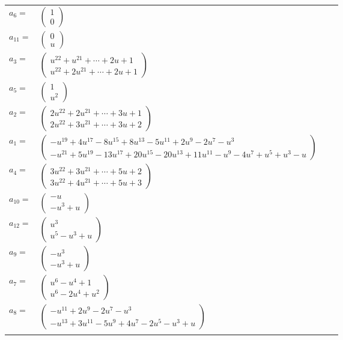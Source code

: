 \documentclass[1p]{elsarticle_modified}
\theoremstyle{definition}
\begin{document}
\begin{tabular}{m{7pt} m{180pt} m{7pt} m{180pt} }
\flushright $a_{6}=$&$\begin{pmatrix}1\\0\end{pmatrix}$ \\
\flushright $a_{11}=$&$\begin{pmatrix}0\\u\end{pmatrix}$ \\
\flushright $a_{3}=$&$\begin{pmatrix}u^{22}+u^{21}+\cdots+2 u+1\\u^{22}+2 u^{21}+\cdots+2 u+1\end{pmatrix}$ \\
\flushright $a_{5}=$&$\begin{pmatrix}1\\u^2\end{pmatrix}$ \\
\flushright $a_{2}=$&$\begin{pmatrix}2 u^{22}+2 u^{21}+\cdots+3 u+1\\2 u^{22}+3 u^{21}+\cdots+3 u+2\end{pmatrix}$ \\
\flushright $a_{1}=$&$\begin{pmatrix}- u^{19}+4 u^{17}-8 u^{15}+8 u^{13}-5 u^{11}+2 u^9-2 u^7- u^3\\- u^{21}+5 u^{19}-13 u^{17}+20 u^{15}-20 u^{13}+11 u^{11}- u^9-4 u^7+u^5+u^3- u\end{pmatrix}$ \\
\flushright $a_{4}=$&$\begin{pmatrix}3 u^{22}+3 u^{21}+\cdots+5 u+2\\3 u^{22}+4 u^{21}+\cdots+5 u+3\end{pmatrix}$ \\
\flushright $a_{10}=$&$\begin{pmatrix}- u\\- u^3+u\end{pmatrix}$ \\
\flushright $a_{12}=$&$\begin{pmatrix}u^3\\u^5- u^3+u\end{pmatrix}$ \\
\flushright $a_{9}=$&$\begin{pmatrix}- u^3\\- u^3+u\end{pmatrix}$ \\
\flushright $a_{7}=$&$\begin{pmatrix}u^6- u^4+1\\u^6-2 u^4+u^2\end{pmatrix}$ \\
\flushright $a_{8}=$&$\begin{pmatrix}- u^{11}+2 u^9-2 u^7- u^3\\- u^{13}+3 u^{11}-5 u^9+4 u^7-2 u^5- u^3+u\end{pmatrix}$\\&\end{tabular}
\end{document}
